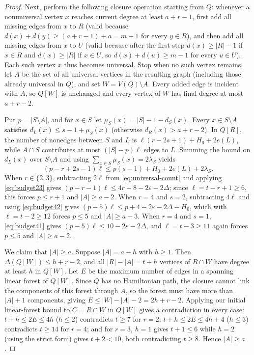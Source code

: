 \documentclass[10pt]{article}
\theoremstyle{compactplain}
\theoremstyle{remark}\newtheorem{remark}[theorem]{Remark}
\begin{document}
\begin{proof}
Next, perform the following closure operation starting from $Q$:
whenever a nonuniversal vertex $x$ reaches current degree at least
$a+r-1$, first add all missing edges from $x$ to $R$ (valid because
$d(x)+d(y)\ge(a+r-1)+a=m-1$ for every $y\in R$), and then add all
missing edges from $x$ to $U$ (valid because after the first step
$d(x)\ge|R|-1$ if $x\in R$ and $d(x)\ge|R|$ if $x\in U$, so
$d(x)+d(u)\ge m-1$ for every $u\in U$). Each such vertex $x$ thus
becomes universal. Stop when no such vertex remains, let $A$ be the set
of all universal vertices in the resulting graph (including those
already universal in $Q$), and set $W=V(Q)\setminus A$. Every added edge
is incident with $A$, so $Q[W]$ is unchanged and every vertex of $W$ has
final degree at most $a+r-2$.

Put $p=|S\setminus A|$, and for $x\in S$ let
$\mu_S(x)=|S|-1-d_S(x)$. Every $x\in S\setminus A$ satisfies
$d_L(x)\le s-1+\mu_S(x)$ (otherwise $d_R(x)>a+r-2$). In $Q[R]$, the
number of nonedges between $S$ and $L$ is $\ell(r-2s+1)+H_0+2e(L)$,
while $A\cap S$ contributes at most $(|S|-p)\ell$ edges to $L$. Summing
the bound on $d_L(x)$ over $S\setminus A$ and using
$\sum_{x\in S}\mu_S(x)=2\lambda_S$ yields
\begin{equation}\label{eq:universal-count}
 (p-r+2s-1)\ell\le p(s-1)+H_0+2e(L)+2\lambda_S.
\end{equation}
When $r\in\{2,3\}$, subtracting $2\ell$ from \eqref{eq:universal-count}
and applying \eqref{eq:budget23} gives
$(p-r-1)\ell\le4r-8-2\varepsilon-2\Delta$; since $\ell=t-r+1\ge6$, this
forces $p\le r+1$ and $|A|\ge a-2$. When $r=4$ and $s=2$, subtracting
$4\ell$ and using \eqref{eq:budget42} gives
$(p-5)\ell\le p+4-2\varepsilon-2\Delta-H_0$, which with $\ell=t-2\ge12$
forces $p\le5$ and $|A|\ge a-3$. When $r=4$ and $s=1$,
\eqref{eq:budget41} gives $(p-5)\ell\le10-2\varepsilon-2\Delta$, and
$\ell=t-3\ge11$ again forces $p\le5$ and $|A|\ge a-2$.

We claim that $|A|\ge a$. Suppose $|A|=a-h$ with $h\ge1$. Then
$\Delta(Q[W])\le h+r-2$, and all $|R|-|A|=t+h$ vertices of $R\cap W$
have degree at least $h$ in $Q[W]$. Let $E$ be the maximum number of
edges in a spanning linear forest of $Q[W]$. Since $Q$ has no
Hamiltonian path, the closure cannot link the components of this forest
through $A$, so the forest must have more than $|A|+1$ components,
giving $E\le|W|-|A|-2=2h+r-2$. Applying our initial linear-forest bound
to $C=R\cap W$ in $Q[W]$ gives a contradiction in every case:
$t+h\le2E\le4h$ ($h\le2$) contradicts $t\ge7$ for $r=2$;
$t+h\le2E\le4h+4$ ($h\le3$) contradicts $t\ge14$ for $r=4$; and for
$r=3$, $h=1$ gives $t+1\le6$ while $h=2$ (using the strict form) gives
$t+2<10$, both contradicting $t\ge8$. Hence $|A|\ge a$.


\end{proof}
\end{document}
